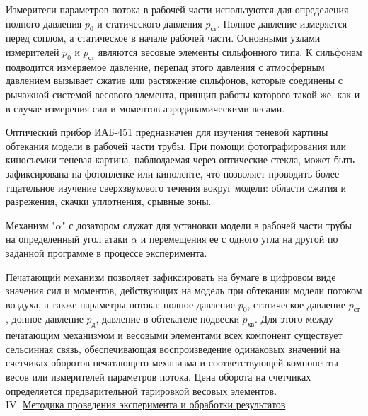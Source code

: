 \documentclass[specialist, subf, href, colorlinks=true, 14pt, final]{disser}
\theoremstyle{definition}
\newcommand{\npart}[2]{\noindent #1. \underline{#2}}
\begin{document}
Измерители параметров потока в рабочей части используются для определения полного давления $p_0$ и статического давления $p_{\text{ст}}$. Полное давление измеряется перед соплом, а статическое в начале рабочей части. Основными узлами измерителей $p_0$ и $p_{\text{ст}}$ являются весовые элементы сильфонного типа. К сильфонам подводится измеряемое давление, перепад этого давления с атмосферным давлением вызывает сжатие или растяжение сильфонов, которые соединены с рычажной системой весового элемента, принцип работы которого такой же, как и в случае измерения сил и моментов аэродинамическими весами.

Оптический прибор ИАБ-451 предназначен для изучения теневой картины обтекания модели в рабочей части трубы. При помощи фотографирования или киносъемки теневая картина, наблюдаемая через оптические стекла, может быть зафиксирована на фотопленке или киноленте, что позволяет проводить более тщательное изучение сверхзвукового течения вокруг модели: области сжатия и разрежения, скачки уплотнения, срывные зоны.

Механизм "$\alpha$"{} с дозатором служат для установки модели в рабочей части трубы на определенный угол атаки $\alpha$ и перемещения ее с одного угла на другой по заданной программе в процессе эксперимента.

Печатающий механизм позволяет зафиксировать на бумаге в цифровом виде значения сил и моментов, действующих на модель при обтекании модели потоком воздуха, а также параметры потока: полное давление $p_0$, статическое давление $p_{\text{ст}}$, донное давление $p_{\text{д}}$, давление в обтекателе подвески $p_{\text{хв}}$. Для этого между печатающим механизмом и весовыми элементами всех компонент существует сельсинная связь, обеспечивающая воспроизведение одинаковых значений на счетчиках оборотов печатающего механизма и соответствующей компоненты весов или измерителей параметров потока. Цена оборота на счетчиках определяется предварительной тарировкой весовых элементов.\\

\npart{IV}{Методика проведения эксперимента и обработки результатов}
\end{document}
